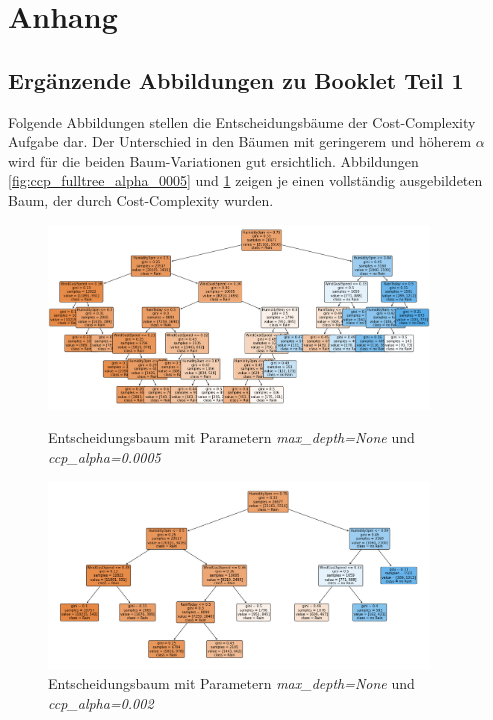 \pagebreak
{}
\section{Anhang}
\subsection{Ergänzende Abbildungen zu Booklet Teil 1}
\label{app:abb_booklet_1}
Folgende Abbildungen stellen die Entscheidungsbäume der Cost-Complexity Aufgabe dar. Der Unterschied in den Bäumen mit geringerem und höherem $\alpha$ wird für die beiden Baum-Variationen gut ersichtlich. Abbildungen \ref{fig:ccp_fulltree_alpha_0005} und \ref{fig:ccp_fulltree_alpha_002} zeigen je einen vollständig ausgebildeten Baum, der durch Cost-Complexity  wurden.\\
\begin{figure}[H]
	\centering
	\begin{minipage}{0.45\textwidth}
		\centering
		\includegraphics[width=0.9\textwidth]{Bilder/ccp_fulltree_alpha_0005.png}
		\caption{Entscheidungsbaum mit Parametern \emph{max\_depth=None} und \emph{ccp\_alpha=0.0005}}
		\label{fig:ccp_fulltree_alpha_0005}
	\end{minipage}\hfill
	\begin{minipage}{0.45\textwidth}
		\centering
		\includegraphics[width=0.9\textwidth]{Bilder/ccp_fulltree_alpha_002.png}
		\caption{Entscheidungsbaum mit Parametern \emph{max\_depth=None} und \emph{ccp\_alpha=0.002}}
		\label{fig:ccp_fulltree_alpha_002}
	\end{minipage}\hfill
\end{figure}
